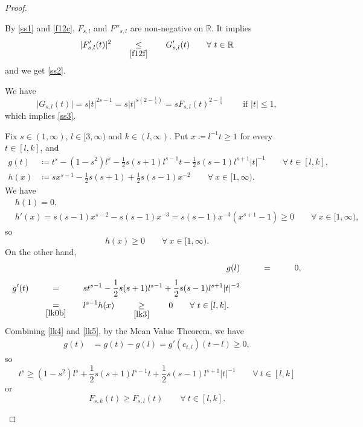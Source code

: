 \documentclass[10pt,a4paper]{amsart}
\newcommand{\RR}{{\mathbb R}}
\newcommand{\abs}[1]{\lvert#1\rvert}
\newcommand{\coex}[2][\hphantom{longexplanation}]{%
  \underset{{#1}}{\overset{\hphantom{longexplanation}}{#2}}
}
\begin{document}
\begin{proof}
\begin{itemize}[wide]
By \eqref{ss1} and \eqref{f12c}, $F_{s,l}$ and $F''_{s,l}$ are
non-negative on $\RR$. It implies
\begin{equation}
  \abs{F'_{s,l}(t)}^{2}
  \coex[\eqref{f12f}]{\le} G'_{s,l}(t)\qquad\forall~ t\in \RR
  \label{f11bb}
\end{equation}
and we get \eqref{ss2}.

We have
\[
  \abs{G_{s,l}(t)}=s|t|^{2s -1}=s|t|^{s\left(2 -\frac{1}{s} \right)}=sF_{s,l}(t)^{2 -\frac{1}{s}}
   \qquad\text{ if }|t|\le 1, \]
which implies \eqref{ss3}.
 
Fix $s\in(1,\infty)$, $l\in [3,\infty)$ and $k \in(l,\infty)$.  Put
$x\coloneqq l^{-1}t\ge 1$ for every $t\in [l,k]$, and
\begin{align}
  g(t)
  &\coloneqq t^{s}- \left(1-s^{2} \right)l^{s}-\frac{1}{2}s(s+1)l^{s-1}t - \frac{1}{2} s(s-1)l^{s+1}|t|^{-1}\qquad\forall~t\in [l,k],
    \label{lk0}\\
  h(x) &\coloneqq sx^{s-1}-\frac{1}{2}s(s+1)+\frac{1}{2}s(s-1)x^{-2}\qquad\forall~x\in[1,\infty).
\label{lk0b}
 \end{align}
 We have
 \begin{align*}
   &h(1)=0,\\
   &h'(x)=s(s-1)x^{s-2} -s(s-1)x^{-3}
=s(s-1)x^{-3}(x^{s+1}-1) \ge 0\qquad\forall~x\in[1,\infty), %
 \end{align*}
 so
 \begin{equation}
 h(x) \ge  0 \qquad\forall~x\in[1,\infty).
  \label{lk3}
\end{equation}
On the other hand,
\begin{align}
  g(l)
  &\coex{=} 0,
    \label{lk4}\\
  \begin{split}
     g'(t)
  &\coex{=} st^{s-1}-\frac{1}{2}s(s+1)l^{s-1}+\frac{1}{2}
    s(s-1)l^{s+1}|t|^{-2}\\
  &\coex[\eqref{lk0b}]{=}l^{s-1}h(x) \coex[\eqref{lk3}]{\ge} 0\qquad\forall~t\in [l,k].
  \end{split}
\label{lk5}
 \end{align}
Combining \eqref{lk4} and \eqref{lk5}, by  the Mean Value Theorem, we
have 
\begin{align*}
  g(t)
  &= g(t) - g(l)
    = g'(c_{t,l}) (t-l) \ge 0,
\end{align*}
so
\[
  t^{s}\ge \left(1-s^{2} \right)l^{s}+\frac{1}{2}s(s+1)l^{s-1}t + \frac{1}{2} s(s-1)l^{s+1}|t|^{-1}\qquad\forall~t\in [l,k]
\]
or 
\begin{equation}
  F_{s,k}(t)\ge F_{s,l}(t)\qquad\forall~t\in [l,k].
\label{sla}
\end{equation}


\end{itemize}
\end{proof}
\end{document}
